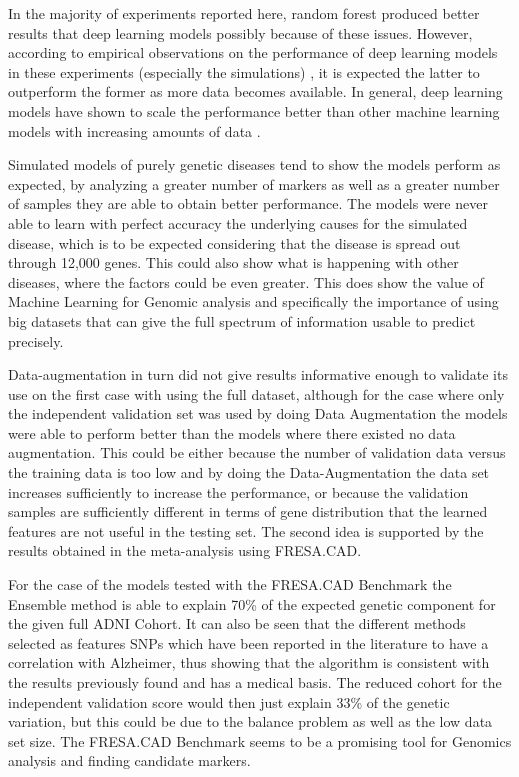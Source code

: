 In the majority of experiments reported here, random forest produced better results that deep learning models possibly because of these issues. However, according to empirical observations on the performance of deep learning models in these experiments (especially the simulations) , it is expected the latter to outperform the former as more data becomes available. In general, deep learning models have shown to scale the performance better than other machine learning models with increasing amounts of data \cite{Goodfellow2016}.

\newpage
Simulated models of purely genetic diseases tend to show the models perform as expected, by analyzing a greater number of markers as well as a greater number of samples they are able to obtain better performance. The models were never able to learn with perfect accuracy the underlying causes for the simulated disease, which is to be expected considering that the disease is spread out through 12,000 genes. This could also show what is happening with other diseases, where the factors could be even greater. This does show the value of Machine Learning for Genomic analysis and specifically the importance of using big datasets that can give the full spectrum of information usable to predict precisely.

Data-augmentation in turn did not give results informative enough to validate its use on the first case with using the full dataset, although for the case where only the independent validation set was used by doing Data Augmentation the models were able to perform better than the models where there existed no data augmentation. This could be either because the number of validation data versus the training data is too low and by doing the Data-Augmentation the data set increases sufficiently to increase the performance, or because the validation samples are sufficiently different in terms of gene distribution that the learned features are not useful in the testing set. The second idea is supported by the results obtained in the meta-analysis using FRESA.CAD. 

For the case of the models tested with the FRESA.CAD Benchmark the Ensemble method is able to explain 70\% of the expected genetic component for the given full ADNI Cohort. It can also be seen that the different methods selected as features SNPs which have been reported in the literature to have a correlation with Alzheimer, thus showing that the algorithm is consistent with the results previously found and has a medical basis. The reduced cohort for the independent validation score would then just explain 33\% of the genetic variation, but this could be due to the balance problem as well as the low data set size. The FRESA.CAD Benchmark seems to be a promising tool for Genomics analysis and finding candidate markers.
 
